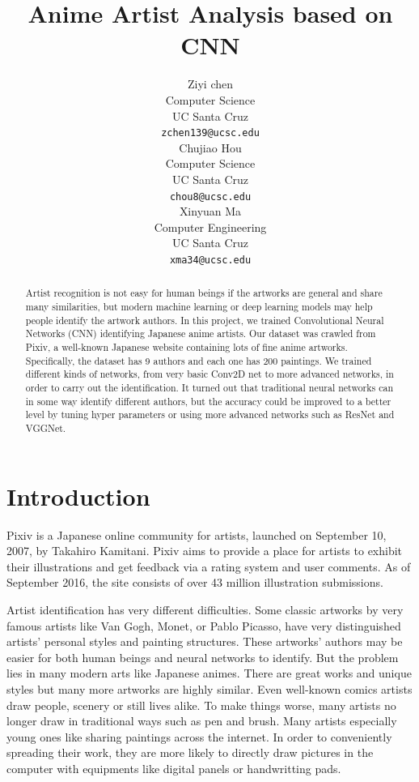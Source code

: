 \documentclass{article}
\title{Anime Artist Analysis based on CNN}
\author{Ziyi chen \\
  Computer Science  \\
  UC Santa Cruz\\
  {\tt zchen139@ucsc.edu} \\\And
   Chujiao Hou\\
  Computer Science  \\
  UC Santa Cruz\\
  {\tt chou8@ucsc.edu} \\\And
   Xinyuan Ma\\
  Computer Engineering  \\
  UC Santa Cruz\\
  {\tt xma34@ucsc.edu} \\}
\begin{document}

\maketitle

\begin{abstract}
Artist recognition is not easy for human beings if the artworks are general and share many similarities, but modern machine learning or deep learning models may help people identify the artwork authors. In this project, we trained Convolutional Neural Networks (CNN) identifying Japanese anime artists. Our dataset was crawled from Pixiv, a well-known Japanese website containing lots of fine anime artworks. Specifically, the dataset has 9 authors and each one has 200 paintings. We trained different kinds of networks, from very basic Conv2D net to more advanced networks, in order to carry out the identification. It turned out that traditional neural networks can in some way identify different authors, but the accuracy could be improved to a better level by tuning hyper parameters or using more advanced networks such as ResNet and VGGNet.

\end{abstract}

\section{Introduction}
\label{gen_inst}

Pixiv is a Japanese online community for artists, launched on September 10, 2007, by Takahiro Kamitani. Pixiv aims to provide a place for artists to exhibit their illustrations and get feedback via a rating system and user comments. As of September 2016, the site consists of over 43 million illustration submissions.

Artist identification has very different difficulties. Some classic artworks by very famous artists like Van Gogh, Monet, or Pablo Picasso, have very distinguished artists’ personal styles and painting structures. These artworks’ authors may be easier for both human beings and neural networks to identify. But the problem lies in many modern arts like Japanese animes. There are great works and unique styles but many more artworks are highly similar. Even well-known comics artists draw people, scenery or still lives alike. To make things worse, many artists no longer draw in traditional ways such as pen and brush. Many artists especially young ones like sharing paintings across the internet. In order to conveniently spreading their work, they are more likely to directly draw pictures in the computer with equipments like digital panels or handwritting pads.
\end{document}
